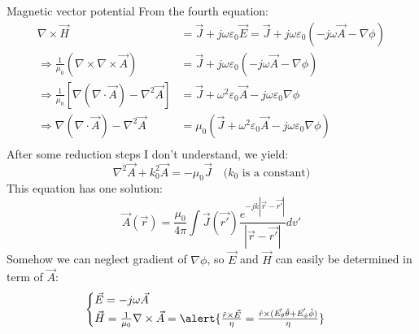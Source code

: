 \documentclass[8pt]{beamer}
\begin{document}
\begin{frame}{Magnetic vector potential}
From the fourth equation:
\begin{equation*}
\begin{split}
\nabla\times\vec{H}&=\vec{J}+j\omega \varepsilon_{0}\vec{E}=\vec{J}+j\omega \varepsilon_{0}(-j\omega\vec{A}-\nabla\phi)\\
\Rightarrow \frac{1}{\mu_{0}}(\nabla\times\nabla\times\vec{A})&=\vec{J}+j\omega \varepsilon_{0}(-j\omega\vec{A}-\nabla\phi)\\
\Rightarrow \frac{1}{\mu_{0}}[\nabla(\nabla\cdot \vec{A})-\nabla^2\vec{A}]&=\vec{J}+\omega^2\varepsilon_{0}\vec{A}-j\omega\varepsilon_{0}\nabla\phi\\
\Rightarrow \nabla(\nabla\cdot \vec{A})-\nabla^2\vec{A}&=\mu_{0}(\vec{J}+\omega^2\varepsilon_{0}\vec{A}-j\omega\varepsilon_{0}\nabla\phi)\\
\end{split}
\end{equation*}
After some reduction steps I don't understand, we yield:
$$\nabla^2\vec{A}+k_{0}^2\vec{A}=-\mu_{0}\vec{J} \quad\text{($k_{0}$ is a constant)}$$
This equation has one solution:
$$\vec{A}(\vec{r})=\frac{\mu_{0}}{4\pi}\int \vec{J}(\vec{r'})\frac{e^{-jk|\vec{r}-\vec{r'}|}}{|\vec{r}-\vec{r'}|}dv'$$
Somehow we can neglect gradient of $\nabla\phi$, so $\vec{E}$ and $\vec{H}$ can easily be determined in term of $\vec{A}$:
\begin{equation*}
    \begin{cases}
    \vec{E}=-j\omega\vec{A}\\
    \vec{H}=\frac{1}{\mu_{0}}\nabla\times\vec{A}=\alert{\frac{\hat r\times\vec{E}}{\eta }=\frac{\hat r\times(\vec{E_{\theta}}\hat \theta+\vec{E_{\phi}}\hat\phi)}{\eta}}\\
    \end{cases}
\end{equation*}
\end{frame}
\end{document}
